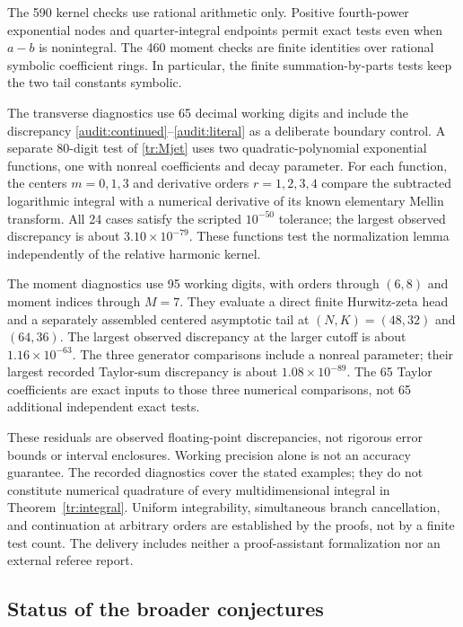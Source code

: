 \documentclass[11pt,letterpaper]{article}
\numberwithin{equation}{section}
\theoremstyle{plain}
\theoremstyle{definition}
\theoremstyle{remark}
\begin{document}
The 590 kernel checks use rational arithmetic only.  Positive
fourth-power exponential nodes and quarter-integral endpoints permit
exact tests even when $a-b$ is nonintegral.  The 460 moment checks are
finite identities over rational symbolic coefficient rings.  In
particular, the finite summation-by-parts tests keep the two tail
constants symbolic.

The transverse diagnostics use 65 decimal working digits and include
the discrepancy \eqref{audit:continued}--\eqref{audit:literal} as a
deliberate boundary control.  A separate 80-digit test of
\eqref{tr:Mjet} uses two quadratic-polynomial exponential functions,
one with nonreal coefficients and decay parameter.  For each function,
the centers $m=0,1,3$ and derivative orders $r=1,2,3,4$ compare the
subtracted logarithmic integral with a numerical derivative of its
known elementary Mellin transform.  All 24 cases satisfy the scripted
$10^{-50}$ tolerance; the largest observed discrepancy is about
$3.10\times10^{-79}$.  These functions test the normalization lemma
independently of the relative harmonic kernel.

The moment diagnostics use 95 working
digits, with orders through $(6,8)$ and moment indices through $M=7$.
They evaluate a direct finite Hurwitz-zeta head and a separately
assembled centered asymptotic tail at $(N,K)=(48,32)$ and $(64,36)$.
The largest observed discrepancy at the larger cutoff is about
$1.16\times10^{-63}$.  The three generator comparisons include a
nonreal parameter; their largest recorded Taylor-sum discrepancy is
about $1.08\times10^{-89}$.  The 65 Taylor coefficients are exact
inputs to those three numerical comparisons, not 65 additional
independent exact tests.

These residuals are observed floating-point discrepancies, not rigorous
error bounds or interval enclosures.  Working precision alone is not
an accuracy guarantee.  The recorded diagnostics cover the stated
examples; they do not constitute numerical quadrature of every
multidimensional integral in Theorem~\ref{tr:integral}.  Uniform
integrability, simultaneous branch cancellation, and continuation at
arbitrary orders are established by the proofs, not by a finite test
count.  The delivery includes neither a proof-assistant formalization
nor an external referee report.

\subsection{Status of the broader conjectures}
\end{document}

